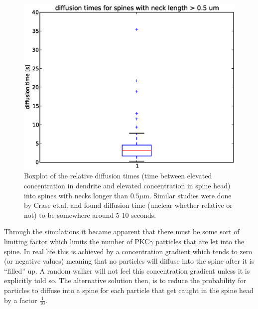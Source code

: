 \begin{figure}[H]
 \centering
 \includegraphics[scale=0.5]{Figures/spine_stats_boxplot_reltime_longneck.eps}
 \caption[Diffusion time for long necked spines]{Boxplot of the relative diffusion times (time between elevated concentration in dendrite and elevated concentration in spine head) into spines with necks longer than $0.5\mu$m. Similar studies were done by Crase et.al. and found diffusion time (unclear whether relative or not) to be somewhere around 5-10 seconds.}
 \label{results:boxplot_relative_diffusiontime_long_neck}
\end{figure}

Through the simulations it became apparent that there must be some sort of limiting factor which limits the number of PKC$\gamma$ particles that are let into the spine. 
In real life this is achieved by a concentration gradient which tends to zero (or negative values) meaning that no particles will diffuse into the spine after it is ``filled'' up. 
A random walker will not feel this concentration gradient unless it is explicitly told so. 
The alternative solution then, is to reduce the probability for particles to diffuse into a spine for each particle that get caught in the spine head by a factor $\frac{1}{10}$. 
